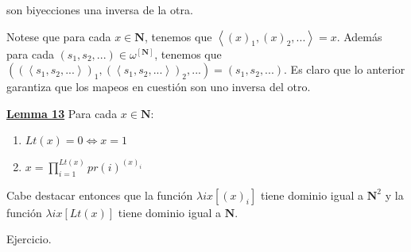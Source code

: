     \par son biyecciones una inversa de la otra.

  \PROOF Notese que para cada $x \in \mathbf{N}$, tenemos que $\left\langle (x)_{1}, (x)_{2}, ...\right\rangle = x$.
    Además para cada $(s_{1}, s_{2}, ...) \in \omega^{\left[\mathbf{N}\right]}$, tenemos que
    $((\left\langle s_{1}, s_{2}, ...\right\rangle)_{1}, (\left\langle s_{1}, s_{2}, ...\right\rangle)_{2}, ...) =
    (s_{1}, s_{2}, ...)$.
    Es claro que lo anterior garantiza que los mapeos en cuestión son uno inversa del otro.

  \QED


  \textbf{\underline{Lemma 13}} Para cada $x \in \mathbf{N}$:

    \begin{enumerate}
      \item $Lt(x) = 0 \Leftrightarrow x = 1$
      \item $x = \prod\nolimits_{i=1}^{Lt(x)} pr(i)^{(x)_{i}}$
    \end{enumerate}

    \par Cabe destacar entonces que la función $\lambda ix[(x)_{i}]$ tiene dominio igual a $\mathbf{N}^{2}$ y la
    función $\lambda ix[Lt(x)]$ tiene dominio igual a $\mathbf{N}$.

  \PROOF Ejercicio.

  \QED
